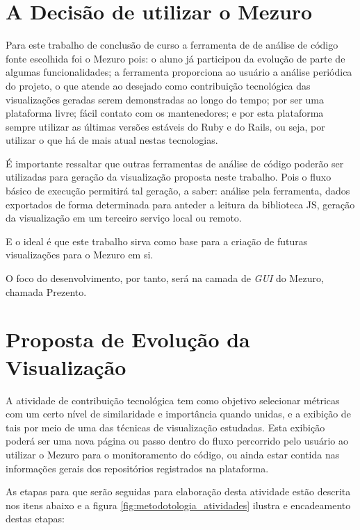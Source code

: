 \newpage

\section{A Decisão de utilizar o Mezuro}

Para este trabalho de conclusão de curso a ferramenta de de análise de código
fonte escolhida foi o Mezuro pois: o aluno já participou da evolução de parte
de algumas funcionalidades; a ferramenta proporciona ao usuário a análise
periódica do projeto, o que atende ao desejado como contribuição tecnológica
das visualizações geradas serem demonstradas ao longo do tempo; por ser uma
plataforma livre; fácil contato com os mantenedores; e por esta plataforma
sempre utilizar as últimas versões estáveis do Ruby e do Rails, ou seja,
por utilizar o que há de mais atual nestas tecnologias.

É importante ressaltar que outras ferramentas de análise de código poderão ser
utilizadas para geração da visualização proposta neste trabalho. Pois o fluxo
básico de execução permitirá tal geração, a saber: análise pela ferramenta,
dados exportados de forma determinada para anteder a leitura da biblioteca JS,
geração da visualização em um terceiro serviço local ou remoto.

E o ideal é que este trabalho sirva como base para a criação de futuras
visualizações para o Mezuro em si.

O foco do desenvolvimento, por tanto, será na camada de \textit{GUI} do Mezuro,
chamada Prezento.

\section{Proposta de Evolução da Visualização}

A atividade de contribuição tecnológica tem como objetivo selecionar métricas
com um certo nível  de similaridade e importância quando unidas, e a exibição de
tais por meio de uma das técnicas de visualização estudadas. Esta exibição
poderá ser uma nova página ou passo dentro do fluxo percorrido pelo usuário ao
utilizar o Mezuro para o monitoramento do código, ou ainda estar contida nas
informações gerais dos repositórios registrados na plataforma.

As etapas para que serão seguidas para elaboração desta atividade estão descrita
nos itens abaixo e a figura \ref{fig:metodotologia_atividades} ilustra e
encadeamento destas etapas:

